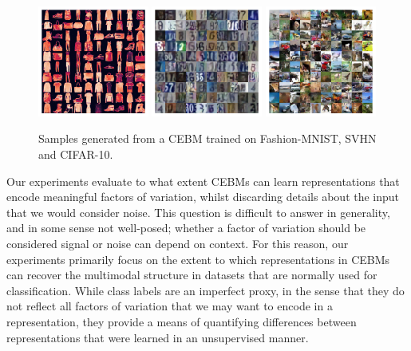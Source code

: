 \documentclass{article}
\begin{document}
\begin{figure}[!t]
\centering
\includegraphics[width=0.325\textwidth]{figures/fmnist_cebm_samples.pdf}
\includegraphics[width=0.325\textwidth]{figures/svhn_cebm_buffer_samples3.pdf}
\includegraphics[width=0.325\textwidth]{figures/cifar10_cebm_buffer_samples.pdf}
\vspace*{-1.5ex}
\caption{Samples generated from a CEBM trained on Fashion-MNIST, SVHN and CIFAR-10.}
\label{fig:generated-samples}
\end{figure}

Our experiments evaluate to what extent CEBMs can learn representations that encode meaningful factors of variation, whilst discarding details about the input that we would consider noise. This question is difficult to answer in generality, and in some sense not well-posed; whether a factor of variation should be considered signal or noise can depend on context. For this reason, our experiments primarily focus on the extent to which representations in CEBMs can recover the multimodal structure in datasets that are normally used for classification. %
While class labels are an imperfect proxy, in the sense that they do not reflect all factors of variation that we may want to encode in a representation, they provide a means of quantifying differences between representations that were learned in an unsupervised manner. 
\end{document}

